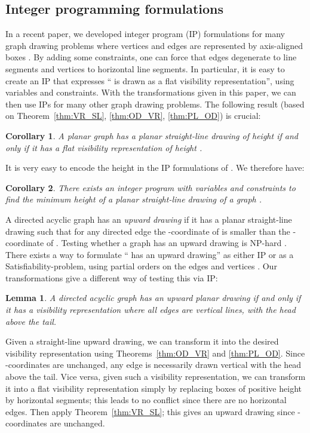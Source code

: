 \documentclass{elsarticle}
\newtheorem{lemma}{Lemma}
\newtheorem{corollary}{Corollary}
\newenvironment{proof}{{\bf Proof: }}{\hspace*{\fill}\medskip}
\begin{document}
\subsection{Integer programming formulations}

In a recent paper, we developed integer program (IP) formulations
for many graph drawing problems where vertices and edges are
represented by axis-aligned boxes \cite{Bie-GD13}.  By adding
some constraints, one can force that edges degenerate to line segments
and vertices to horizontal line segments.  In particular, it is easy to 
create an IP that expresses `` is drawn as a flat visibility
representation'', using  variables and constraints.
With the transformations given in this paper, we can then use IPs
for many other graph drawing problems. 
The following result (based on Theorem~\ref{thm:VR_SL}, 
\ref{thm:OD_VR}, 
\ref{thm:PL_OD}) is crucial: 

\begin{corollary}
A planar graph  has a planar straight-line drawing of height 
if and only if it has a flat visibility representation of height .
\end{corollary}

It is very easy to encode the height in the IP formulations
of \cite{Bie-GD13}. 
We therefore have:

\begin{corollary}
There exists an integer program with  variables and constraints
to find the minimum height of a planar straight-line drawing of a graph .
\end{corollary}



A directed acyclic graph has an
{\em upward drawing} if it has a planar straight-line drawing such
that for any directed edge  the -coordinate of 
is smaller than the -coordinate of .  Testing whether a graph
has an upward drawing is NP-hard \cite{GT01}.  There exists a way
to formulate `` has an upward drawing'' as either IP
or as a Satisfiability-problem, using partial orders on
the edges and vertices \cite{CZ-GD12}.  Our transformations give
a different way of testing this via IP:

\begin{lemma}
A directed acyclic graph has an upward planar drawing if and only
if it has a visibility representation where all edges are vertical
lines, with the head above the tail.
\end{lemma}
\begin{proof}
Given a straight-line upward drawing, we can transform it into the
desired visibility representation using Theorems~\ref{thm:OD_VR}
and \ref{thm:PL_OD}.
Since -coordinates are unchanged, any edge is necessarily drawn
vertical with the head above the tail.  Vice versa, given such a visibility
representation, we can transform it into a flat visibility representation
simply by replacing boxes of positive height by horizontal segments; this
leads to no conflict since there are no horizontal edges.  Then apply
Theorem~\ref{thm:VR_SL}; this gives an upward drawing since -coordinates
are unchanged.
\end{proof}
\end{document}
